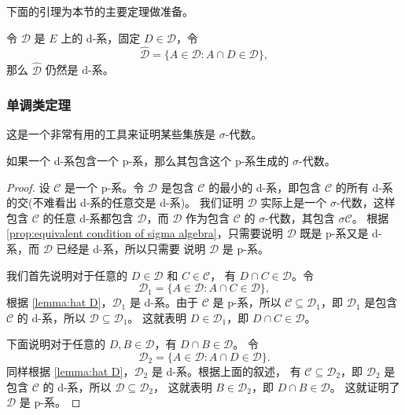 \documentclass[fontset=none]{Notes}
\begin{document}
下面的引理为本节的主要定理做准备。

\begin{lemma}\label{lemma:hat D}
  令 $\mathcal{D}$ 是 $E$ 上的 d-系，固定 $D\in \mathcal{D}$，令
  \[
    \hat{\mathcal{D}}=\{A\in \mathcal{D}: A\cap D\in \mathcal{D}\},
  \]
  那么 $\hat{\mathcal{D}}$ 仍然是 d-系。
\end{lemma}

\subsubsection{单调类定理}

这是一个非常有用的工具来证明某些集族是 $\sigma$-代数。

\begin{theorem}
  如果一个 d-系包含一个 p-系，那么其包含这个 p-系生成的 $\sigma$-代数。
\end{theorem}
\begin{proof}
  设 $\mathcal{C}$ 是一个 p-系。令 $\mathcal{D}$ 是包含 $\mathcal{C}$
  的最小的 d-系，即包含 $\mathcal{C}$ 的所有 d-系的交(不难看出 d-系的任意交是 d-系)。
  我们证明 $\mathcal{D}$ 实际上是一个 $\sigma$-代数，这样包含 $\mathcal{C}$
  的任意 d-系都包含 $\mathcal{D}$，而 $\mathcal{D}$ 作为包含 $\mathcal{C}$
  的 $\sigma$-代数，其包含 $\sigma \mathcal{C}$。
  根据 \autoref{prop:equivalent condition of sigma algebra}，只需要说明 
  $\mathcal{D}$ 既是 p-系又是 d-系，而 $\mathcal{D}$ 已经是 d-系，所以只需要
  说明 $\mathcal{D}$ 是 p-系。

  我们首先说明对于任意的 $D\in \mathcal{D}$ 和 $C\in \mathcal{C}$，
  有 $D\cap C\in \mathcal{D}$。令
  \[
    \mathcal{D}_1=\{A\in \mathcal{D}: A\cap C\in \mathcal{D}\},  
  \]
  根据 \autoref{lemma:hat D}，$\mathcal{D}_1$ 是 d-系。由于 $\mathcal{C}$
  是 p-系，所以 $\mathcal{C}\subseteq \mathcal{D}_1$，即 $\mathcal{D}_1$
  是包含 $\mathcal{C}$ 的 d-系，所以 $\mathcal{D}\subseteq \mathcal{D}_1$。
  这就表明 $D\in \mathcal{D}_1$，即 $D\cap C\in \mathcal{D}$。

  下面说明对于任意的 $D,B\in \mathcal{D}$，有 $D\cap B\in \mathcal{D}$。
  令
  \[
    \mathcal{D}_2=\{A\in \mathcal{D}: A\cap D\in \mathcal{D}\} .
  \]
  同样根据 \autoref{lemma:hat D}，$\mathcal{D}_2$ 是 d-系。根据上面的叙述，
  有 $\mathcal{C}\subseteq \mathcal{D}_2$，即 $\mathcal{D}_2$ 是包含 
  $\mathcal{C}$ 的 d-系，所以 $\mathcal{D}\subseteq \mathcal{D}_2$，
  这就表明 $B\in \mathcal{D}_2$，即 $D\cap B\in \mathcal{D}$。
  这就证明了 $\mathcal{D}$ 是 p-系。
\end{proof}
\end{document}
